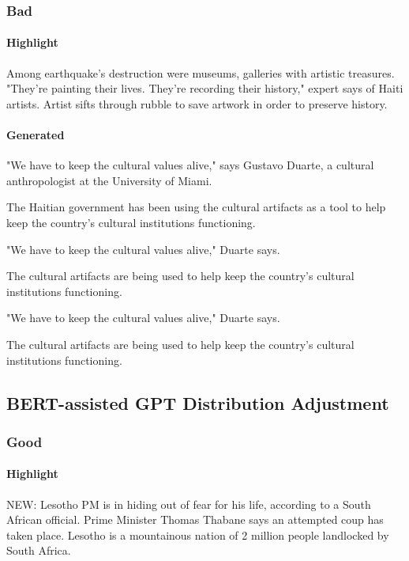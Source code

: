 \documentclass{article}
\begin{document}
\subsubsection{Bad}


\paragraph{Highlight}
Among earthquake's destruction were museums, galleries with artistic treasures. "They're painting their lives. They're recording their history," expert says of Haiti artists. Artist sifts through rubble to save artwork in order to preserve history.

\paragraph{Generated} 


"We have to keep the cultural values alive," says Gustavo Duarte, a cultural anthropologist at the University of Miami.

The Haitian government has been using the cultural artifacts as a tool to help keep the country's cultural institutions functioning.

"We have to keep the cultural values alive," Duarte says.

The cultural artifacts are being used to help keep the country's cultural institutions functioning.

"We have to keep the cultural values alive," Duarte says.

The cultural artifacts are being used to help keep the country's cultural institutions functioning.

\subsection{BERT-assisted GPT Distribution Adjustment}
\label{dau-w}

\subsubsection{Good}

\paragraph{Highlight} 
NEW: Lesotho PM is in hiding out of fear for his life, according to a South African official. Prime Minister Thomas Thabane says an attempted coup has taken place. Lesotho is a mountainous nation of 2 million people landlocked by South Africa.
\end{document}

